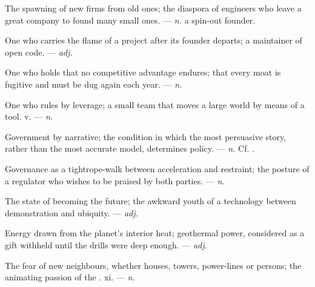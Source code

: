  The spawning of new firms from old ones; the diaspora of engineers who leave a great company to found many small ones.   ---  \textit{n.} a spin-out founder.

 One who carries the flame of a project after its founder departs; a maintainer of open code.  ---  \textit{adj.}

 One who holds that no competitive advantage endures; that every moat is fugitive and must be dug again each year.  ---  \textit{n.}

 One who rules by leverage; a small team that moves a large world by means of a tool.   v. ---  \textit{n.}

 Government by narrative; the condition in which the most persuasive story, rather than the most accurate model, determines policy.  ---  \textit{n.} Cf. .

 Governance as a tightrope-walk between acceleration and restraint; the posture of a regulator who wishes to be praised by both parties. ---  \textit{n.}

 The state of becoming the future; the awkward youth of a technology between demonstration and ubiquity.  ---  \textit{adj.}

 Energy drawn from the planet's interior heat; geothermal power, considered as a gift withheld until the drills were deep enough. ---  \textit{adj.}

 The fear of new neighbours, whether houses, towers, power-lines or persons; the animating passion of the .   xi. ---  \textit{n.}

